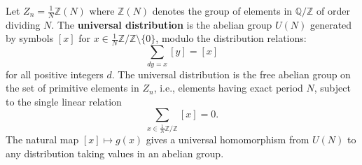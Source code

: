 Let $Z_n = \frac{1}{N} \mathbb{Z}(N)$ where $\mathbb{Z}(N)$ denotes the group of elements in $\mathbb{Q}/\mathbb{Z}$ of order dividing $N$. The \textbf{universal distribution} is the abelian group $U(N)$ generated by symbols $[x]$ for $x \in \frac{1}{N}\mathbb{Z}/\mathbb{Z} \setminus \{0\}$, modulo the distribution relations:
$$\sum_{dy = x} [y] = [x]$$
for all positive integers $d$. The universal distribution is the free abelian group on the set of primitive elements in $Z_n$, i.e., elements having exact period $N$, subject to the single linear relation
$$\sum_{x \in \frac{1}{N}\mathbb{Z}/\mathbb{Z}} [x] = 0.$$
The natural map $[x] \mapsto g(x)$ gives a universal homomorphism from $U(N)$ to any distribution taking values in an abelian group.
